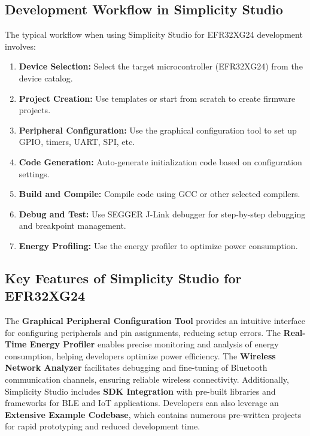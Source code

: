 \documentclass[
  9pt,
  letterpaper,
  abstract,
  titlepage]{scrbook}
\begin{document}
\subsection{Development Workflow in Simplicity
Studio}\label{development-workflow-in-simplicity-studio}

The typical workflow when using Simplicity Studio for EFR32XG24
development involves:

\begin{enumerate}
\def\labelenumi{\arabic{enumi}.}
\item
  \textbf{Device Selection:} Select the target microcontroller
  (EFR32XG24) from the device catalog.
\item
  \textbf{Project Creation:} Use templates or start from scratch to
  create firmware projects.
\item
  \textbf{Peripheral Configuration:} Use the graphical configuration
  tool to set up GPIO, timers, UART, SPI, etc.
\item
  \textbf{Code Generation:} Auto-generate initialization code based on
  configuration settings.
\item
  \textbf{Build and Compile:} Compile code using GCC or other selected
  compilers.
\item
  \textbf{Debug and Test:} Use SEGGER J-Link debugger for step-by-step
  debugging and breakpoint management.
\item
  \textbf{Energy Profiling:} Use the energy profiler to optimize power
  consumption.
\end{enumerate}

\subsection{Key Features of Simplicity Studio for
EFR32XG24}\label{key-features-of-simplicity-studio-for-efr32xg24}

The \textbf{Graphical Peripheral Configuration Tool} provides an
intuitive interface for configuring peripherals and pin assignments,
reducing setup errors. The \textbf{Real-Time Energy Profiler} enables
precise monitoring and analysis of energy consumption, helping
developers optimize power efficiency. The \textbf{Wireless Network
Analyzer} facilitates debugging and fine-tuning of Bluetooth
communication channels, ensuring reliable wireless connectivity.
Additionally, Simplicity Studio includes \textbf{SDK Integration} with
pre-built libraries and frameworks for BLE and IoT applications.
Developers can also leverage an \textbf{Extensive Example Codebase},
which contains numerous pre-written projects for rapid prototyping and
reduced development time.
\end{document}
